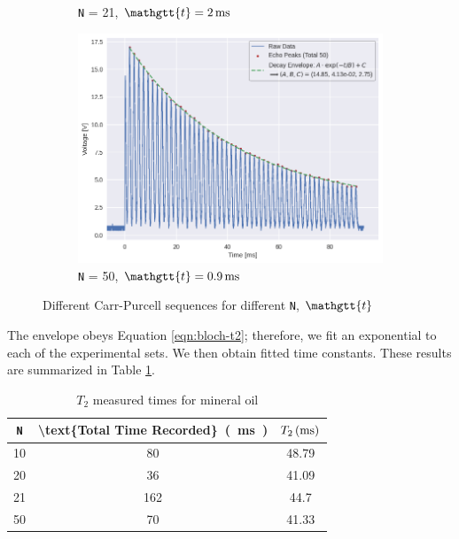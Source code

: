 \documentclass[%
 reprint,
 amsmath,amssymb,
 aps,
]{revtex4-2}
\newcommand{\taucode}{\mathgtt{t}}
\begin{document}
\begin{figure}[hbpt]
\begin{subfigure}{0.4\linewidth}
        \caption{\texttt{N} = 21, $\taucode = \SI{2}{\milli\second}$}
    \end{subfigure}
    \begin{subfigure}{0.4\linewidth}
        \includegraphics[width = 0.8\linewidth]{figs/purcell/data4.png}
        \caption{\texttt{N} = 50, $\taucode = \SI{0.9}{\milli\second}$}
    \end{subfigure}
    \caption{Different Carr-Purcell sequences for different \texttt{N}, $\taucode$}\label{fig:experimental-purcell}
\end{figure}


The envelope obeys Equation \ref{eqn:bloch-t2}; therefore, we fit an exponential to each of the experimental sets. We then obtain fitted time constants. These results are summarized in Table \ref{tab:t2-times}.

\begin{table}[htbp]
    \centering
    \caption{$T_2$ measured times for mineral oil}
      \begin{tabular}{|c|c|c|}
      \hline
      \texttt{N} & \SI[parse-numbers=false]{\text{Total Time Recorded}}{(\milli\second)} & $\SI[parse-numbers=false]{T_2}{(\milli\second)}$\\
      
      \hline
      10    & 80    & 48.79 \\
      \hline
      20    & 36    & 41.09 \\
      \hline
      21    & 162   & 44.7 \\
      \hline
      50    & 70    & 41.33 \\
      \hline
      \end{tabular}%
    \label{tab:t2-times}%
  \end{table}%
  
\end{document}
